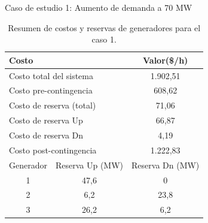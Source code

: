 \begin{frame}{Caso de estudio 1: Aumento de demanda a 70 MW}
\small
\begin{table}[H]
    \renewcommand{\arraystretch}{1.3}
    \centering
    \caption{Resumen de costos y reservas de generadores para el caso 1.}
    \label{tab:res_ctos_caso1}
    \begin{tabular}{|c|c|c|}
        \hline
        \multicolumn{2}{|l|}{Costo} & Valor(\$/h) \\
        \hline
        \multicolumn{2}{|l|}{Costo total del sistema} & 1.902,51 \\
        \multicolumn{2}{|l|}{Costo pre-contingencia} & 608,62 \\
        \multicolumn{2}{|l|}{Costo de reserva (total)} & 71,06 \\
        \multicolumn{2}{|l|}{Costo de reserva Up} & 66,87 \\
        \multicolumn{2}{|l|}{Costo de reserva Dn} & 4,19 \\
        \multicolumn{2}{|l|}{Costo post-contingencia} & 1.222,83 \\
        \hline \hline
        Generador & Reserva Up (MW) & Reserva Dn (MW) \\
        \hline
        1 & 47,6 & 0 \\
        2 & 6,2 & 23,8 \\
        3 & 26,2 & 6,2 \\
        \hline
    \end{tabular}
\end{table}

\end{frame}

